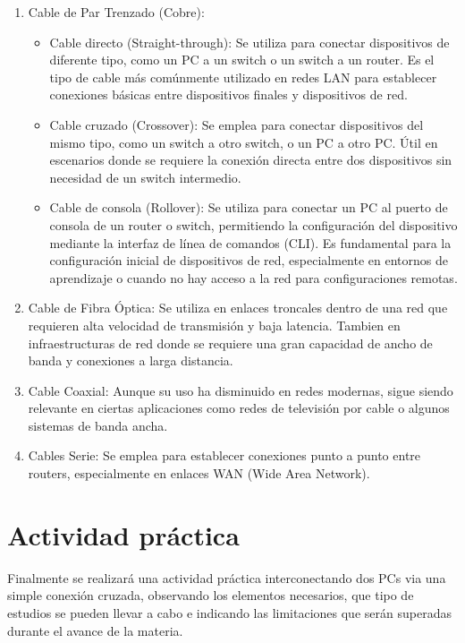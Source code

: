 \documentclass[12pt, a4paper]{article}
\begin{document}
\begin{enumerate}
    \item Cable de Par Trenzado (Cobre):
    \begin{itemize}
        \item Cable directo (Straight-through): Se utiliza para conectar dispositivos de diferente tipo, como un PC a un switch o un switch a un router. Es el tipo de cable más comúnmente utilizado en redes LAN para establecer conexiones básicas entre dispositivos finales y dispositivos de red.
        \item Cable cruzado (Crossover): Se emplea para conectar dispositivos del mismo tipo, como un switch a otro switch, o un PC a otro PC. Útil en escenarios donde se requiere la conexión directa entre dos dispositivos sin necesidad de un switch intermedio.
        \item Cable de consola (Rollover): Se utiliza para conectar un PC al puerto de consola de un router o switch, permitiendo la configuración del dispositivo mediante la interfaz de línea de comandos (CLI). Es fundamental para la configuración inicial de dispositivos de red, especialmente en entornos de aprendizaje o cuando no hay acceso a la red para configuraciones remotas.
    \end{itemize}
    \item Cable de Fibra Óptica: Se utiliza en enlaces troncales dentro de una red que requieren alta velocidad de transmisión y baja latencia. Tambien en infraestructuras de red donde se requiere una gran capacidad de ancho de banda y conexiones a larga distancia.
    \item Cable Coaxial: Aunque su uso ha disminuido en redes modernas, sigue siendo relevante en ciertas aplicaciones como redes de televisión por cable o algunos sistemas de banda ancha.
    \item Cables Serie: Se emplea para establecer conexiones punto a punto entre routers, especialmente en enlaces WAN (Wide Area Network).
\end{enumerate}

\section{Actividad práctica}
Finalmente se realizará una actividad práctica interconectando dos PCs via una simple conexión cruzada, observando los elementos necesarios, que tipo de estudios se pueden llevar a cabo e indicando las limitaciones que serán superadas durante el avance de la materia.
\end{document}
